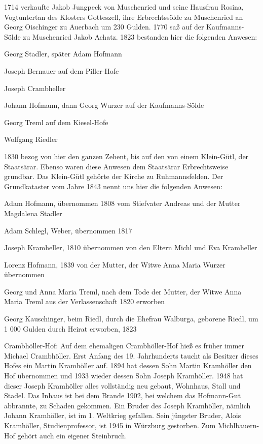 1714 verkaufte Jakob Jungpeck von Muschenried und seine Hausfrau Rosina,
Vogtuntertan des Klosters Gotteszell, ihre Erbrechtssölde zu Muschenried an
Georg Oischinger zu Auerbach um 230 Gulden. 1770 saß auf der Kaufmanns-Sölde zu
Muschenried Jakob Achatz. 1823 bestanden hier die folgenden Anwesen:



Georg Stadler, später Adam Hofmann

Joseph Bernauer auf dem Piller-Hofe

Joseph Crambheller

Johann Hofmann, dann Georg Wurzer auf der Kaufmanns-Sölde

Georg Treml auf dem Kiesel-Hofe

Wolfgang Riedler



1830 bezog von hier den ganzen Zehent, bis auf den von einem Klein-Gütl, der
Staatsärar. Ebenso waren diese Anwesen dem Staatsärar Erbrechtsweise grundbar.
Das Klein-Gütl gehörte der Kirche zu Ruhmannsfelden. Der Grundkataster vom Jahre
1843 nennt uns hier die folgenden Anwesen:



Adam Hofmann, übernommen 1808 vom Stiefvater Andreas und der Mutter Magdalena
Stadler

Adam Schlegl, Weber, übernommen 1817

Joseph Kramheller, 1810 übernommen von den Eltern Michl und Eva Kramheller

Lorenz Hofmann, 1839 von der Mutter, der Witwe Anna Maria Wurzer übernommen

Georg und Anna Maria Treml, nach dem Tode der Mutter, der Witwe Anna Maria Treml
aus der Verlassenschaft 1820 erworben

Georg Kauschinger, beim Riedl, durch die Ehefrau Walburga, geborene Riedl, um 1
000 Gulden durch Heirat erworben, 1823



Crambhöller-Hof: Auf dem ehemaligen Crambhöller-Hof hieß es früher immer Michael
Crambhöller. Erst Anfang des 19. Jahrhunderts taucht als Besitzer dieses Hofes
ein Martin Kramhöller auf. 1894 hat dessen Sohn Martin Kramhöller den Hof
übernommen und 1933 wieder dessen Sohn Joseph Kramhöller. 1948 hat dieser Joseph
Kramhöller alles vollständig neu gebaut, Wohnhaus, Stall und Stadel. Das Inhaus
ist bei dem Brande 1902, bei welchem das Hofmann-Gut abbrannte, zu Schaden
gekommen. Ein Bruder des Joseph Kramhöller, nämlich Johann Kramhöller, ist im 1.
Weltkrieg gefallen. Sein jüngster Bruder, Alois Kramhöller, Studienprofessor,
ist 1945 in Würzburg gestorben. Zum Michlbauern-Hof gehört auch ein eigener
Steinbruch.

